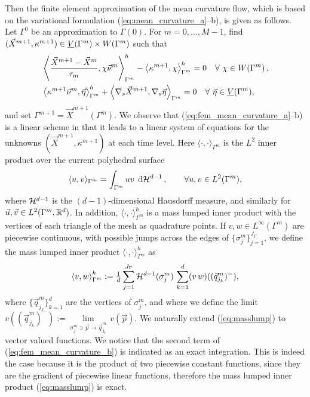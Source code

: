 Then the finite element approximation of the mean curvature flow, which is
based on the variational formulation (\ref{eq:mean_curvature_a}--b), is given
as follows. Let $\Gamma^0$ be an approximation to $\Gamma(0)$. For $m=0,\ldots,
M-1$, find $(\vec{X}^{m+1}, \kappa^{m+1}) \in \underline{V}(\Gamma^m) \times W(\Gamma^m)$
such that
\begin{subequations}
\begin{align}
&\left\langle \frac{\vec{X}^{m + 1} - \vec{X}^{m}}{\tau_m},
\chi\vec{\nu}^m\right\rangle_{\Gamma^m}^h - \left\langle\kappa^{m+1}, \chi
\right\rangle_{\Gamma^m}^h=0\quad \forall\ \chi \in
W(\Gamma^m)\,,\label{eq:fem_mean_curvature_a}\\
&\left\langle\kappa^{m+1}\vec{\nu}^m, \vec{\eta}\right\rangle_{\Gamma^m}^{h} +
\left\langle\nabla_s\vec{X}^{m + 1},
\nabla_s\vec{\eta}\right\rangle_{\Gamma^m}=0\quad \forall\ \vec\eta \in \underline{V}(\Gamma^m),
\label{eq:fem_mean_curvature_b}
\end{align}
\end{subequations}
and set $\Gamma^{m+1} = \vec{X}^{m+1}(\Gamma^m)$. We observe that
(\ref{eq:fem_mean_curvature_a}--b) is a linear scheme in that it leads to a
linear system of equations for the unknowns $(\vec{X}^{m+1}, \kappa^{m+1})$ at
each time level. Here $\langle\cdot,\cdot\rangle_{\Gamma^m}$ is the $L^2$ inner
product over the current polyhedral surface
\begin{equation}\label{}
\langle u,v\rangle_{\Gamma^m} =
\int_{\Gamma^m}uv\,\;{\rm d}{\cal H}^{d-1}\,, \qquad\forall u,v \in
L^2(\Gamma^m),
\end{equation}
where $\mathcal{H}^{d-1}$ is the $(d-1)$-dimensional Hausdorff measure, and
similarly for $\vec{u},\vec{v}\in L^2(\Gamma^m,{\mathbb R}^d)$. In addition,
$\langle \cdot,\cdot\rangle_{\Gamma^m}^h$ is a mass lumped inner product with
the vertices of each triangle of the mesh as quadrature points. If $v,w \in
L^\infty(\Gamma^m)$ are piecewise continuous, with possible jumps
across the edges of $\{\sigma_j^m\}_{j=1}^{J_\Gamma}$, we define the mass
lumped inner product $\langle\cdot,\cdot\rangle_{\Gamma^m}^h$ as
\begin{equation} \label{eq:masslump}
\left\langle v, w \right\rangle^h_{\Gamma^m} :=
\tfrac1d \sum_{j=1}^{J_\Gamma} \mathcal{H}^{d-1}(\sigma^m_j)\,
\sum_{k=1}^{d} (v\,w)((\vec{q}^m_{j_k})^-),
\end{equation}
where $\{\vec{q}^m_{j_k}\}_{k=1}^{d}$ are the vertices of $\sigma^m_j$, and
where we define the limit $v((\vec{q}^m_{j_k})^-)
:= \underset{\sigma^m_j\ni \vec{p}\to \vec{q}^m_{j_k}}{\lim}\, v(\vec{p})$. We
naturally extend (\ref{eq:masslump}) to vector valued functions. We notice that
the second term of (\ref{eq:fem_mean_curvature_b}) is indicated as an exact
integration. This is indeed the case because it is the product of two
piecewise constant functions, since they are the gradient of piecewise linear
functions, therefore the mass lumped inner product (\ref{eq:masslump}) is
exact.

